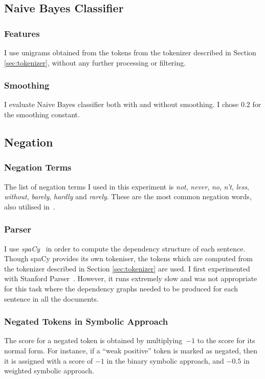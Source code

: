 \subsection{Naive Bayes Classifier}
\subsubsection{Features}
I use unigrams obtained from the tokens from the tokenizer described in Section \ref{sec:tokenizer}, without any further processing or filtering.
\subsubsection{Smoothing}
I evaluate Naive Bayes classifier both with and without smoothing. I chose $0.2$ for the smoothing constant.
\subsection{Negation}
\subsubsection{Negation Terms}
The list of negation terms I used in this experiment is \textit{not}, \textit{never}, \textit{no}, \textit{n't}, \textit{less}, \textit{without}, \textit{barely}, \textit{hardly} and \textit{rarely}. These are the most common negation words, also utilised in~\citep{jia2009effect}.
\subsubsection{Parser}
I use \emph{spaCy}~\citep{spacy} in order to compute the dependency structure of each sentence. Though spaCy provides its own tokeniser, the tokens which are computed from the tokenizer described in Section \ref{sec:tokenizer} are used. I first experimented with Stanford Parser~\citep{stanford}. However, it runs extremely slow and was not appropriate for this task where the dependency graphs needed to be produced for each sentence in all the documents.
\subsubsection{Negated Tokens in Symbolic Approach}
The score for a negated token is obtained by multiplying~$-1$ to the score for its normal form. For instance, if a ``weak positive'' token is marked as negated, then it is assigned with a score of $-1$ in the binary symbolic approach, and $-0.5$ in weighted symbolic approach.
